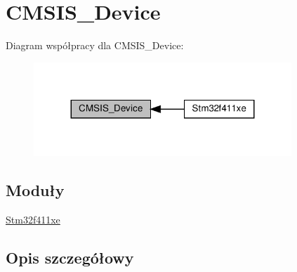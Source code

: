 \hypertarget{group___c_m_s_i_s___device}{}\section{C\+M\+S\+I\+S\+\_\+\+Device}
\label{group___c_m_s_i_s___device}
Diagram współpracy dla C\+M\+S\+I\+S\+\_\+\+Device\+:\nopagebreak
\begin{figure}[H]
\begin{center}
\leavevmode
\includegraphics[width=275pt]{group___c_m_s_i_s___device}
\end{center}
\end{figure}
\subsection*{Moduły}
\begin{DoxyCompactItemize}
\item 
\hyperlink{group__stm32f411xe}{Stm32f411xe}
\end{DoxyCompactItemize}


\subsection{Opis szczegółowy}
